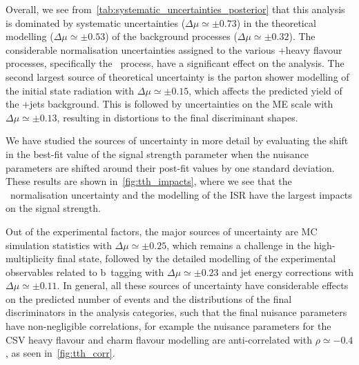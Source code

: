Overall, we see from~\cref{tab:systematic_uncertainties_posterior} that this analysis is dominated by systematic uncertainties ($\Delta \mu \simeq \pm 0.73$) in the theoretical modelling ($\Delta \mu \simeq \pm 0.53$)  of the background processes ($\Delta \mu \simeq \pm 0.32$). The considerable normalisation uncertainties assigned to the various \ttbar+heavy flavour processes, specifically the \ttbb~process, have a significant effect on the analysis. The second largest source of theoretical uncertainty is the parton shower modelling of the initial state radiation with $\Delta \mu \simeq \pm 0.15$, which affects the predicted yield of the \ttbar+jets background. This is followed by uncertainties on the ME scale with $\Delta \mu \simeq \pm 0.13$, resulting in distortions to the final discriminant shapes.

We have studied the sources of uncertainty in more detail by evaluating the shift in the best-fit value of the signal strength parameter when the nuisance parameters are shifted around their post-fit values by one standard deviation. These results are shown in~\cref{fig:tth_impacts}, where we see that the \ttbb~normalisation uncertainty and the modelling of the ISR have the largest impacts on the signal strength.

Out of the experimental factors, the major sources of uncertainty are MC simulation statistics with $\Delta \mu \simeq \pm 0.25$, which remains a challenge in the high-multiplicity final state, followed by the detailed modelling of the experimental observables related to b~tagging with $\Delta \mu \simeq \pm 0.23$ and jet energy corrections with $\Delta \mu \simeq \pm 0.11$. In general, all these sources of uncertainty have considerable effects on the predicted number of events and the distributions of the final discriminators in the analysis categories, such that the final nuisance parameters have non-negligible correlations, for example the nuisance parameters for the CSV heavy flavour and charm flavour modelling are anti-correlated with $\rho \simeq -0.4$, as seen in~\cref{fig:tth_corr}.

